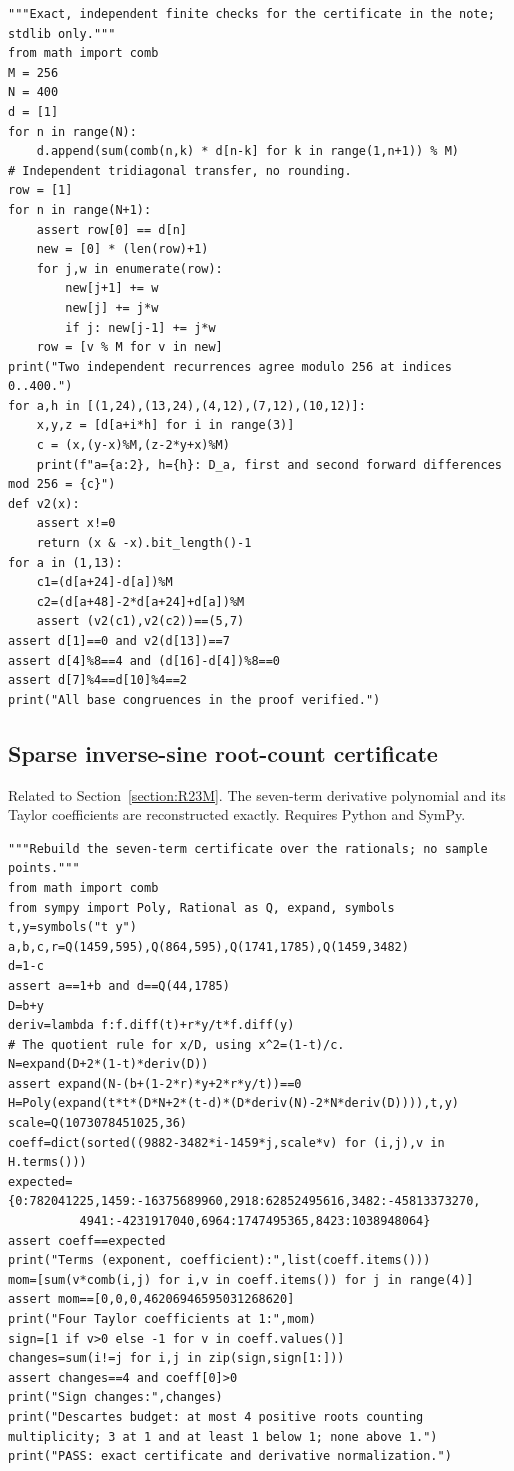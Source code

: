 \documentclass[11pt,a4paper]{article}
\begin{document}
\begin{Verbatim}[fontsize=\scriptsize,breaklines,breakanywhere]
"""Exact, independent finite checks for the certificate in the note; stdlib only."""
from math import comb
M = 256
N = 400
d = [1]
for n in range(N):
    d.append(sum(comb(n,k) * d[n-k] for k in range(1,n+1)) % M)
# Independent tridiagonal transfer, no rounding.
row = [1]
for n in range(N+1):
    assert row[0] == d[n]
    new = [0] * (len(row)+1)
    for j,w in enumerate(row):
        new[j+1] += w
        new[j] += j*w
        if j: new[j-1] += j*w
    row = [v % M for v in new]
print("Two independent recurrences agree modulo 256 at indices 0..400.")
for a,h in [(1,24),(13,24),(4,12),(7,12),(10,12)]:
    x,y,z = [d[a+i*h] for i in range(3)]
    c = (x,(y-x)%M,(z-2*y+x)%M)
    print(f"a={a:2}, h={h}: D_a, first and second forward differences mod 256 = {c}")
def v2(x):
    assert x!=0
    return (x & -x).bit_length()-1
for a in (1,13):
    c1=(d[a+24]-d[a])%M
    c2=(d[a+48]-2*d[a+24]+d[a])%M
    assert (v2(c1),v2(c2))==(5,7)
assert d[1]==0 and v2(d[13])==7
assert d[4]%8==4 and (d[16]-d[4])%8==0
assert d[7]%4==d[10]%4==2
print("All base congruences in the proof verified.")
\end{Verbatim}
\subsection{Sparse inverse-sine root-count certificate}
\noindent Related to Section~\ref{section:R23M}. The seven-term derivative polynomial and its Taylor coefficients are reconstructed exactly. Requires Python and SymPy.

\begin{Verbatim}[fontsize=\scriptsize,breaklines,breakanywhere]
"""Rebuild the seven-term certificate over the rationals; no sample points."""
from math import comb
from sympy import Poly, Rational as Q, expand, symbols
t,y=symbols("t y")
a,b,c,r=Q(1459,595),Q(864,595),Q(1741,1785),Q(1459,3482)
d=1-c
assert a==1+b and d==Q(44,1785)
D=b+y
deriv=lambda f:f.diff(t)+r*y/t*f.diff(y)
# The quotient rule for x/D, using x^2=(1-t)/c.
N=expand(D+2*(1-t)*deriv(D))
assert expand(N-(b+(1-2*r)*y+2*r*y/t))==0
H=Poly(expand(t*t*(D*N+2*(t-d)*(D*deriv(N)-2*N*deriv(D)))),t,y)
scale=Q(1073078451025,36)
coeff=dict(sorted((9882-3482*i-1459*j,scale*v) for (i,j),v in H.terms()))
expected={0:782041225,1459:-16375689960,2918:62852495616,3482:-45813373270,
          4941:-4231917040,6964:1747495365,8423:1038948064}
assert coeff==expected
print("Terms (exponent, coefficient):",list(coeff.items()))
mom=[sum(v*comb(i,j) for i,v in coeff.items()) for j in range(4)]
assert mom==[0,0,0,46206946595031268620]
print("Four Taylor coefficients at 1:",mom)
sign=[1 if v>0 else -1 for v in coeff.values()]
changes=sum(i!=j for i,j in zip(sign,sign[1:]))
assert changes==4 and coeff[0]>0
print("Sign changes:",changes)
print("Descartes budget: at most 4 positive roots counting multiplicity; 3 at 1 and at least 1 below 1; none above 1.")
print("PASS: exact certificate and derivative normalization.")
\end{Verbatim}
\end{document}
